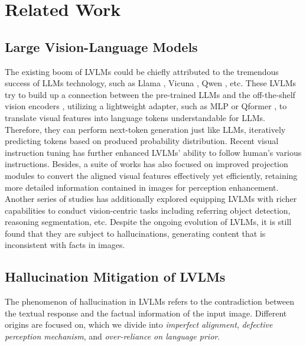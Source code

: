 \section{Related Work}
\label{related work}
\subsection{Large Vision-Language Models}
The existing boom of LVLMs \cite{liu2024improved-llava, bai2023qwen-vl, liu2024llavanext, dong2024internlmxcomposerhd} could be chiefly attributed to the tremendous success of LLMs technology, such as Llama \cite{touvron2023llama}, Vicuna \cite{vicuna2023}, Qwen \cite{bai2023qwen}, etc. These LVLMs try to build up a connection between the pre-trained LLMs and the off-the-shelf vision encoders \cite{dosovitskiy2020vit, radford2021clip}, utilizing a lightweight adapter, such as MLP \cite{liu2024improved-llava} or Qformer \cite{bai2023qwen-vl}, to translate visual features into language tokens understandable for LLMs. Therefore, they can perform next-token generation just like LLMs, iteratively predicting tokens based on produced probability distribution. 
Recent visual instruction tuning \cite{liu2024llava, liu2024improved-llava} has further enhanced LVLMs' ability to follow human's various instructions. Besides, a suite of works \cite{cha2024honeybee, yao2024deco} has also focused on improved projection modules to convert the aligned visual features effectively yet efficiently, retaining more detailed information contained in images for perception enhancement. Another series of studies \cite{lai2024lisa, zhang2025llava-grounded} has additionally explored equipping LVLMs with richer capabilities to conduct vision-centric tasks including referring object detection, reasoning segmentation, etc. Despite the ongoing evolution of LVLMs, it is still found that they are subject to hallucinations, generating content that is inconsistent with facts in images. 

\subsection{Hallucination Mitigation of LVLMs}
The phenomenon of hallucination in LVLMs \cite{fu2025blink} refers to the contradiction between the textual response and the factual information of the input image. Different origins are focused on, which we divide into \textit{imperfect alignment}, \textit{defective perception mechanism}, and \textit{over-reliance on language prior}. 


